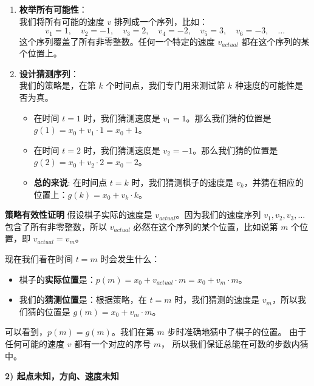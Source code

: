 \documentclass[UTF8]{ctexart}
\begin{document}
\begin{enumerate}
    \item \textbf{枚举所有可能性}：\\
    我们将所有可能的速度 $v$ 排列成一个序列，比如：
    \[ v_1 = 1, \quad v_2 = -1, \quad v_3 = 2, \quad v_4 = -2, \quad v_5 = 3, \quad v_6 = -3, \quad \dots \]
    这个序列覆盖了所有非零整数。任何一个特定的速度 $v_{actual}$ 都在这个序列的某个位置上。

    \item \textbf{设计猜测序列}：\\
    我们的策略是，在第 $k$ 个时间点，我们专门用来测试第 $k$ 种速度的可能性是否为真。
    \begin{itemize}
        \item 在时间 $t=1$ 时，我们猜测速度是 $v_1=1$。那么我们猜的位置是 $g(1) = x_0 + v_1 \cdot 1 = x_0 + 1$。
        \item 在时间 $t=2$ 时，我们猜测速度是 $v_2=-1$。那么我们猜的位置是 $g(2) = x_0 + v_2 \cdot 2 = x_0 - 2$。
        \item \textbf{总的来说}: 在时间点 $t=k$ 时，我们猜测棋子的速度是 $v_k$，并猜在相应的位置上：$g(k) = x_0 + v_k \cdot k$。
    \end{itemize}
\end{enumerate}

\textbf{策略有效性证明}
假设棋子实际的速度是 $v_{actual}$。因为我们的速度序列 $v_1, v_2, v_3, \dots$ 包含了所有非零整数，所以 $v_{actual}$ 必然在这个序列的某个位置，比如说第 $m$ 个位置，即 $v_{actual} = v_m$。

现在我们看在时间 $t=m$ 时会发生什么：
\begin{itemize}
    \item 棋子的\textbf{实际位置}是：$p(m) = x_0 + v_{actual} \cdot m = x_0 + v_m \cdot m$。
    \item 我们的\textbf{猜测位置}是：根据策略，在 $t=m$ 时，我们猜测的速度是 $v_m$，所以我们猜的位置是 $g(m) = x_0 + v_m \cdot m$。
\end{itemize}
可以看到，$p(m) = g(m)$。我们在第 $m$ 步时准确地猜中了棋子的位置。
由于任何可能的速度 $v$ 都有一个对应的序号 $m$，
所以我们保证总能在可数的步数内猜中。


\textbf{2) 起点未知，方向、速度未知}
\end{document}
